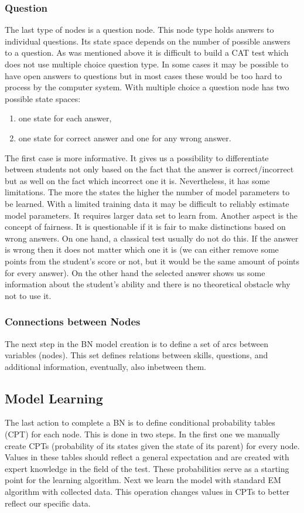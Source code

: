 \subsubsection{Question}

The last type of nodes is a question node. This node type holds answers to individual questions. Its state space depends on the number of possible answers to a question. As was mentioned above it is difficult to build a CAT test which does not use multiple choice question type. In some cases it may be possible to have open answers to questions but in most cases these would be too hard to process by the computer system. With multiple choice a question node has two possible state spaces:
\begin{enumerate}
	\item one state for each answer,
	\item one state for correct answer and one for any wrong answer.
\end{enumerate}
The first case is more informative. It gives us a possibility to differentiate between students not only based on the fact that the answer is correct/incorrect but as well on the fact which incorrect one it is. Nevertheless, it has some limitations. The more the states the higher the number of model parameters to be learned. With a limited training data it may be difficult to reliably estimate model parameters. It requires larger data set to learn from. Another aspect is the concept of fairness. It is questionable if it is fair to make distinctions based on wrong answers. On one hand, a classical test usually do not do this. If the answer is wrong then it does not matter which one it is (we can either remove some points from the student's score or not, but it would be the same amount of points for every answer). On the other hand the selected answer shows us some information about the student's ability and there is no theoretical obstacle why not to use it.

\subsubsection{Connections between Nodes}

The next step in the BN model creation is to define a set of arcs between variables (nodes). This set defines relations between skills, questions, and additional information, eventually, also inbetween them.  

\subsection{Model Learning}
The last action to complete a BN is to define conditional probability tables (CPT) for each node. This is done in two steps. In the first one we manually create CPTs (probability of its states given the state of its parent) for every node. Values in these tables should reflect a general expectation and are created with expert knowledge in the field of the test. These probabilities serve as a starting point for the learning algorithm. Next we learn the model with standard EM algorithm with collected data. This operation changes values in CPTs to better reflect our specific data.


